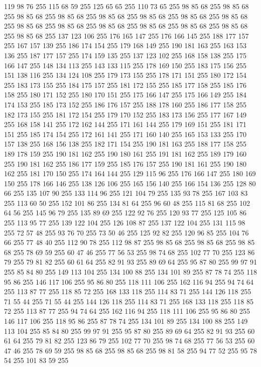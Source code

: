 119 98 76 255 115 68 59 255 125 65 65 255 110 73 65 255 98 85 68 255 98 85 68 255 98 85 68 255 98 85 68 255 98 85 68 255 98 85 68 255 98 85 68 255 98 85 68 255 98 85 68 255 98 85 68 255 98 85 68 255 98 85 68 255 98 85 68 255 98 85 68 255 98 85 68 255 137 123 106 255 176 165 147 255 176 166 145 255 188 177 157 255 167 157 139 255 186 174 154 255 179 168 149 255 190 181 163 255 163 153 136 255 187 177 157 255 174 159 135 255 137 123 102 255 168 158 138 255 175 166 147 255 148 134 113 255 143 133 115 255 178 169 150 255 183 175 156 255 151 138 116 255 134 124 108 255 179 173 155 255 178 171 151 255 180 172 154 255 183 173 155 255 184 175 157 255 181 172 155 255 185 177 158 255 185 176 158 255 180 171 152 255 180 170 151 255 175 166 147 255 175 166 149 255 184 174 153 255 185 173 152 255 186 176 157 255 188 178 160 255 186 177 158 255 182 173 155 255 181 172 154 255 179 170 152 255 183 173 156 255 177 167 149 255 168 158 141 255 172 162 144 255 171 161 144 255
179 169 151 255 181 171 151 255 185 174 154 255 172 161 141 255 171 160 140 255 165 153 133 255 170 157 138 255 168 156 138 255 182 171 154 255 190 181 163 255 188 177 158 255 189 178 159 255 190 181 162 255 190 180 161 255 191 181 162 255 189 179 160 255 190 181 162 255 186 177 159 255 185 176 157 255 190 181 161 255 190 180 162 255 181 170 150 255 174 164 144 255 129 115 96 255 176 166 147 255 180 169 150 255 178 166 146 255 138 126 106 255 165 156 140 255 166 154 136 255 128 80 66 255 135 107 90 255 133 114 96 255 121 104 79 255 135 93 78 255 167 103 83 255 113 60 50 255 152 101 86 255 134 81 64 255 96 60 48 255 115 81 68 255 102 64 56 255 145 96 79 255 135 89 69 255 122 92 76 255 120 93 77 255 125 105 86 255 113 95 77 255 139 122 104 255 126 108 87 255 137 122 104 255 131 115 98 255 72 57 48 255 93 76 70 255 73 50 46 255 125 92 82 255 120 96 85 255 104 76 66 255 77 48 40 255 112 90 78 255 112 98 87 255 98 85 68 255 98 85 68 255 98 85 68 255
78 69 59 255 60 47 46 255 77 56 53 255 98 74 68 255 102 77 70 255 123 86 79 255 79 81 82 255 60 61 64 255 82 91 93 255 89 69 64 255 95 87 80 255 99 97 91 255 85 84 80 255 149 113 104 255 134 100 88 255 134 101 89 255 87 78 74 255 118 95 86 255 146 117 106 255 95 86 80 255 118 111 106 255 162 116 94 255 94 74 64 255 113 87 77 255 118 85 72 255 168 133 118 255 114 83 71 255 144 126 118 255 71 55 44 255 71 55 44 255 144 126 118 255 114 83 71 255 168 133 118 255 118 85 72 255 113 87 77 255 94 74 64 255 162 116 94 255 118 111 106 255 95 86 80 255 146 117 106 255 118 95 86 255 87 78 74 255 134 101 89 255 134 100 88 255 149 113 104 255 85 84 80 255 99 97 91 255 95 87 80 255 89 69 64 255 82 91 93 255 60 61 64 255 79 81 82 255 123 86 79 255 102 77 70 255 98 74 68 255 77 56 53 255 60 47 46 255 78 69 59 255 98 85 68 255 98 85 68 255 98 81 58 255 94 77 52 255 95 78 54 255 101 83 59 255
